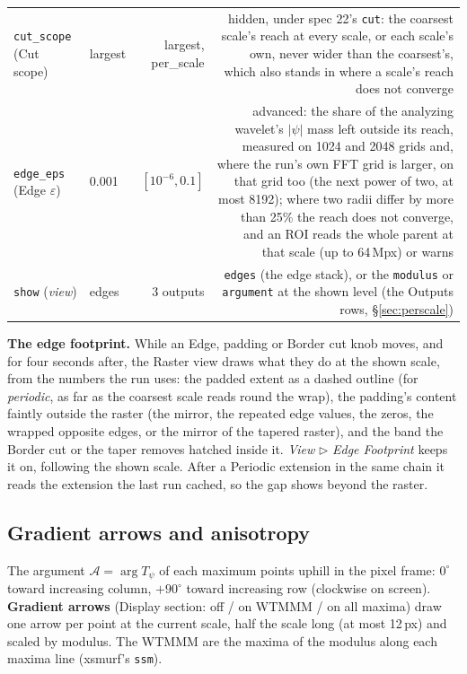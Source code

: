 \documentclass[10pt]{article}
\begin{document}
\begin{longtable}{P l R N}
\texttt{cut\_scope} (Cut scope) & largest & largest, per\_scale & hidden, under spec 22's \texttt{cut}: the coarsest scale's reach at every scale, or each scale's own, never wider than the coarsest's, which also stands in where a scale's reach does not converge \\
\texttt{edge\_eps} (Edge $\varepsilon$) & 0.001 & $[10^{-6},0.1]$ & advanced: the share of the analyzing wavelet's $|\psi|$ mass left outside its reach, measured on 1024 and 2048 grids and, where the run's own FFT grid is larger, on that grid too (the next power of two, at most 8192); where two radii differ by more than 25\% the reach does not converge, and an ROI reads the whole parent at that scale (up to 64\,Mpx) or warns \\
\texttt{show} (\emph{view}) & edges & 3 outputs & \texttt{edges} (the edge stack), or the \texttt{modulus} or \texttt{argument} at the shown level (the Outputs rows, \S\ref{sec:perscale}) \\
\bottomrule
\end{longtable}

\textbf{The edge footprint.} While an Edge, padding or Border cut knob moves, and for four seconds
after, the Raster view draws what they do at the shown scale, from the numbers the run uses: the
padded extent as a dashed outline (for \emph{periodic}, as far as the coarsest scale reads round
the wrap), the padding's content faintly outside the raster (the mirror, the repeated edge values,
the zeros, the wrapped opposite edges, or the mirror of the tapered raster), and the band the
Border cut or the taper removes hatched inside it. \emph{View} $\triangleright$ \emph{Edge
Footprint} keeps it on, following the shown scale. After a Periodic extension in the same chain
it reads the extension the last run cached, so the gap shows beyond the raster.

\subsection*{Gradient arrows and anisotropy}\label{sec:arrows}
The argument $\mathcal{A}=\arg T_\psi$ of each maximum points uphill in the pixel frame:
$0^\circ$ toward increasing column, $+90^\circ$ toward increasing row (clockwise on screen).
\textbf{Gradient arrows} (Display section: off / on WTMMM / on all maxima) draw one arrow per
point at the current scale, half the scale long (at most 12\,px) and scaled by modulus. The
WTMMM are the maxima of the modulus along each maxima line (xsmurf's \texttt{ssm}).
\end{document}
